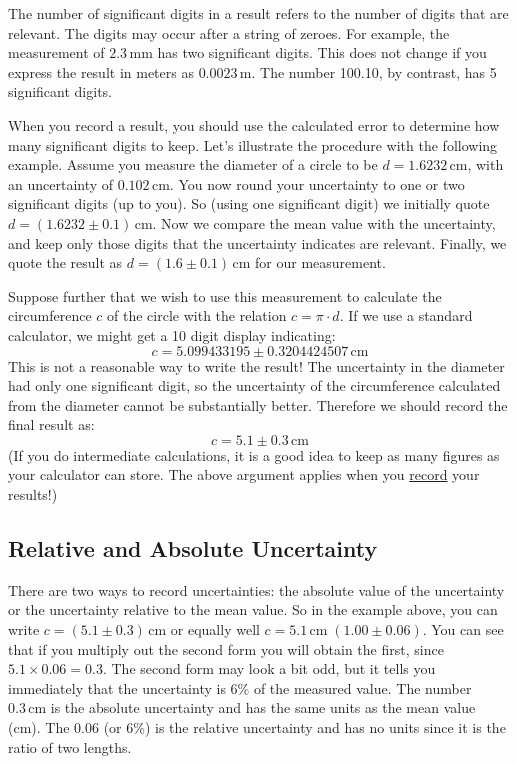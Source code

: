 \documentclass{article}
\begin{document}
The number of significant digits in a result refers to the number of digits that are relevant. The digits may occur after a string of zeroes. For example, the measurement of $2.3\,\mathrm{mm}$ has two significant digits. This does not change if you express the result in meters as $0.0023\,\mathrm{m}$. The number 100.10, by contrast, has 5 significant digits.

When you record a result, you should use the calculated error to determine how many significant digits to keep. Let's illustrate the procedure with the following example. Assume you measure the diameter of a circle to be $d = 1.6232\,\mathrm{cm}$, with an uncertainty of $0.102\,\mathrm{cm}$. You now round your uncertainty to one or two significant digits (up to you). So (using one significant digit) we initially quote $d = (1.6232 \pm 0.1)\,\mathrm{cm}$. Now we compare the mean value with the uncertainty, and keep only those digits that the uncertainty indicates are relevant. Finally, we quote the result as $d = (1.6 \pm 0.1)\,\mathrm{cm}$ for our measurement.

Suppose further that we wish to use this measurement to calculate the circumference $c$ of the circle with the relation $c = \pi\cdot d$. If we use a standard calculator, we might get a 10 digit display indicating:
\begin{equation}
    c = 5.099433195\pm 0.3204424507\,\mathrm{cm}
\end{equation}
This is not a reasonable way to write the result!  The uncertainty in the diameter had only one significant digit, so the uncertainty of the circumference calculated from the diameter cannot be substantially better. Therefore we should record the final result as: 
\begin{equation}
    c = 5.1\pm 0.3\,\mathrm{cm}
\end{equation}
(If you do intermediate calculations, it is a good idea to keep as many figures as your calculator can store. The above argument applies when you \underline{record} your results!)

\subsection{Relative and Absolute Uncertainty}

There are two ways to record uncertainties: the absolute value of the uncertainty or the uncertainty relative to the mean value. So in the example above, you can write $c = (5.1 \pm 0.3)\,\mathrm{cm}$ or equally well $c = 5.1\,\mathrm{cm}\; (1.00 \pm 0.06)$. You can see that if you multiply out the second form you will obtain the first, since $5.1 \times 0.06 = 0.3$. The second form may look a bit odd, but it tells you immediately that the uncertainty is 6\% of the measured value. The number $0.3\,\mathrm{cm}$ is the absolute uncertainty and has the same units as the mean value (cm). The 0.06 (or 6\%) is the relative uncertainty and has no units since it is the ratio of two lengths.
\end{document}
